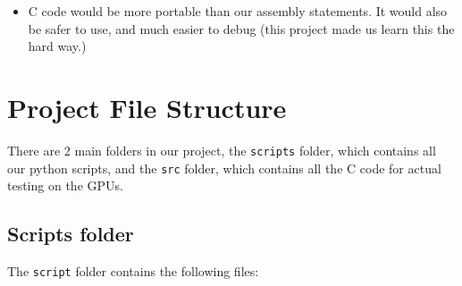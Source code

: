 \documentclass[10pt, a4paper]{report}
\begin{document}
\begin{itemize}
\item C code would be more portable than our assembly statements.
It would also be safer to use, and much easier to debug (this project made us
learn this the hard way.)
\end{itemize}

\section{Project File Structure}
There are 2 main folders in our project, the \verb+scripts+ folder, which
contains all our python scripts, and the \verb+src+ folder, which contains all
the C code for actual testing on the GPUs.

\subsection{Scripts folder}
The \verb+script+ folder contains the following files:
\end{document}
